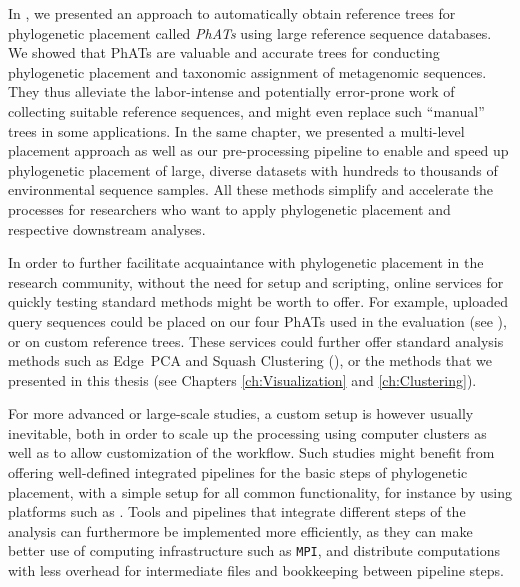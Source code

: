 In , we presented an approach to automatically obtain
reference trees for phylogenetic placement called \emph{\acfp{PhAT}} using large reference sequence databases.
We showed that \acp{PhAT} are valuable and accurate trees for
conducting phylogenetic placement and taxonomic assignment of metagenomic sequences.
They thus alleviate the labor-intense and potentially error-prone work of collecting suitable reference sequences,
and might even replace such ``manual'' trees in some applications.
In the same chapter, we presented a multi-level placement approach as well as our pre-processing pipeline
to enable and speed up phylogenetic placement
of large, diverse datasets with hundreds to thousands of environmental sequence samples.
All these methods simplify and accelerate the processes for researchers
who want to apply phylogenetic placement and respective downstream analyses.

In order to further facilitate acquaintance with phylogenetic placement in the research community,
without the need for setup and scripting, online services for quickly testing standard methods might be worth to offer.
For example, uploaded query sequences could be placed on our four \acp{PhAT} used in the evaluation
(see ),
or on custom reference trees.
These services could further offer standard analysis methods such as Edge~PCA and Squash Clustering
(),
or the methods that we presented in this thesis (see Chapters \ref{ch:Visualization} and \ref{ch:Clustering}).

For more advanced or large-scale studies, a custom setup is however usually inevitable,
both in order to scale up the processing using computer clusters as well as to allow customization of the workflow.
Such studies might benefit from offering well-defined integrated pipelines for the basic steps of phylogenetic placement,
with a simple setup for all common functionality,
for instance by using platforms such as  \cite{Afgan2018}.
Tools and pipelines that integrate different steps of the analysis can furthermore be implemented more efficiently,
as they can make better use of computing infrastructure such as \texttt{\acs{MPI}},
and distribute computations with less overhead for intermediate files and bookkeeping between pipeline steps.

